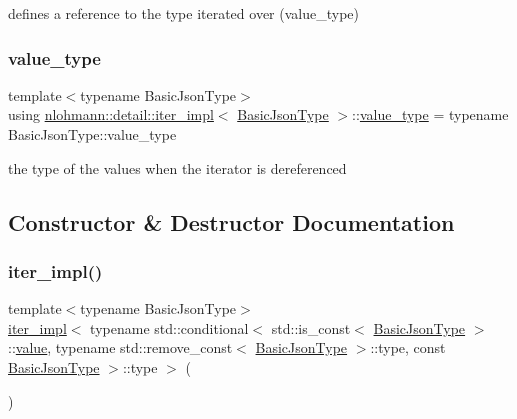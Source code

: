 defines a reference to the type iterated over (value\+\_\+type) 

\mbox{\label{classnlohmann_1_1detail_1_1iter__impl_ab35586a44f2222272c5346baa3013f67}} 
\subsubsection{\texorpdfstring{value\+\_\+type}{value\_type}}
{\footnotesize\ttfamily template$<$typename Basic\+Json\+Type$>$ \\
using \hyperlink{classnlohmann_1_1detail_1_1iter__impl}{nlohmann\+::detail\+::iter\+\_\+impl}$<$ \hyperlink{classnlohmann_1_1detail_1_1iter__impl_abf18f18793f84b0222aebb5a2a87da7a}{Basic\+Json\+Type} $>$\+::\hyperlink{classnlohmann_1_1detail_1_1iter__impl_ab35586a44f2222272c5346baa3013f67}{value\+\_\+type} =  typename Basic\+Json\+Type\+::value\+\_\+type}



the type of the values when the iterator is dereferenced 



\subsection{Constructor \& Destructor Documentation}
\mbox{\label{classnlohmann_1_1detail_1_1iter__impl_a19aa457f9c4af1b7e3af59839132cc5c}} 
\subsubsection{\texorpdfstring{iter\+\_\+impl()}{iter\_impl()}\hspace{0.1cm}{\footnotesize\ttfamily [1/4]}}
{\footnotesize\ttfamily template$<$typename Basic\+Json\+Type$>$ \\
\hyperlink{classnlohmann_1_1detail_1_1iter__impl}{iter\+\_\+impl}$<$ typename std\+::conditional$<$ std\+::is\+\_\+const$<$ \hyperlink{classnlohmann_1_1detail_1_1iter__impl_abf18f18793f84b0222aebb5a2a87da7a}{Basic\+Json\+Type} $>$\+::\hyperlink{classnlohmann_1_1detail_1_1iter__impl_ab447c50354c6611fa2ae0100ac17845c}{value}, typename std\+::remove\+\_\+const$<$ \hyperlink{classnlohmann_1_1detail_1_1iter__impl_abf18f18793f84b0222aebb5a2a87da7a}{Basic\+Json\+Type} $>$\+::type, const \hyperlink{classnlohmann_1_1detail_1_1iter__impl_abf18f18793f84b0222aebb5a2a87da7a}{Basic\+Json\+Type} $>$\+::type $>$ (\begin{DoxyParamCaption}{ }\end{DoxyParamCaption})\hspace{0.3cm}{\ttfamily [default]}}



